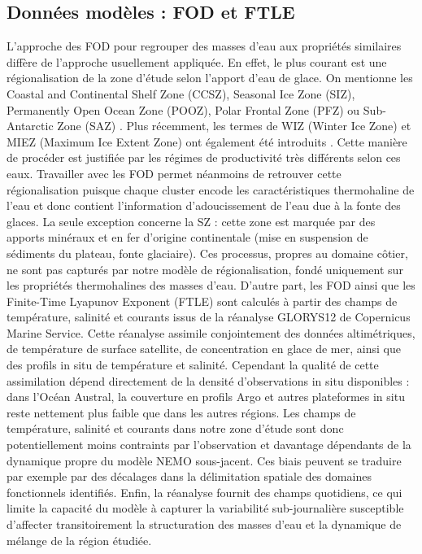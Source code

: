 \subsection{Données modèles : FOD et FTLE}
L'approche des FOD pour regrouper des masses d'eau aux propriétés similaires diffère de l'approche usuellement appliquée. En effet, le plus courant est une régionalisation de la zone d'étude selon l'apport d'eau de glace. On mentionne les Coastal and Continental Shelf Zone (CCSZ), Seasonal Ice Zone (SIZ), Permanently Open Ocean Zone (POOZ), Polar Frontal Zone (PFZ) ou Sub-Antarctic Zone (SAZ) \cite{treguer1992}. Plus récemment, les termes de WIZ (Winter Ice Zone) et MIEZ (Maximum Ice Extent Zone) ont également été introduits \cite{adroli2026}. Cette manière de procéder est justifiée par les régimes de productivité très différents selon ces eaux. Travailler avec les FOD permet néanmoins de retrouver cette régionalisation puisque chaque cluster encode les caractéristiques thermohaline de l'eau et donc contient l'information d'adoucissement de l'eau due à la fonte des glaces. La seule exception concerne la SZ : cette zone est marquée par des apports minéraux et en fer d'origine continentale (mise en suspension de sédiments du plateau, fonte glaciaire). Ces processus, propres au domaine côtier, ne sont pas capturés par notre modèle de régionalisation, fondé uniquement sur les propriétés thermohalines des masses d'eau.
D'autre part, les FOD ainsi que les Finite-Time Lyapunov Exponent (FTLE) sont calculés à partir des champs de température, salinité et courants issus de la réanalyse GLORYS12 de Copernicus Marine Service. Cette réanalyse assimile conjointement des données altimétriques, de température de surface satellite, de concentration en glace de mer, ainsi que des profils in situ de température et salinité. Cependant la qualité de cette assimilation dépend directement de la densité d'observations in situ disponibles \cite{lellouche2021copernicus} : dans l'Océan Austral, la couverture en profils Argo et autres plateformes in situ reste nettement plus faible que dans les autres régions. Les champs de température, salinité et courants dans notre zone d'étude sont donc potentiellement moins contraints par l'observation et davantage dépendants de la dynamique propre du modèle NEMO sous-jacent. Ces biais peuvent se traduire par exemple par des décalages dans la délimitation spatiale des domaines fonctionnels identifiés. Enfin, la réanalyse fournit des champs quotidiens, ce qui limite la capacité du modèle à capturer la variabilité sub-journalière susceptible d'affecter transitoirement la structuration des masses d'eau et la dynamique de mélange de la région étudiée.




